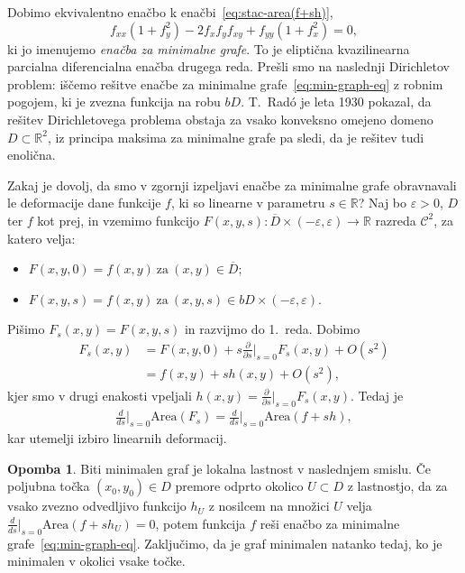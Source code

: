 \documentclass[12pt,a4paper,twoside]{article}
\theoremstyle{definition} %
\newtheorem{opomba}[definicija]{Opomba}
\theoremstyle{plain} %
\numberwithin{equation}{section}  %
\newcommand{\R}{\mathbb R}
\begin{document}
Dobimo ekvivalentno enačbo k enačbi~\eqref{eq:stac-area(f+sh)},
\begin{equation} \label{eq:min-graph-eq}
f_{xx}(1+f_{y}^2) - 2f_{x}f_{y}f_{xy} + f_{yy}(1+f_{x}^2) = 0,
\end{equation}
ki jo imenujemo \emph{enačba za minimalne grafe}.
To je eliptična kvazilinearna parcialna diferencialna enačba drugega reda. \newline
Prešli smo na naslednji Dirichletov problem: iščemo rešitve enačbe za minimalne grafe~\eqref{eq:min-graph-eq} z robnim pogojem, ki je zvezna funkcija na robu $bD$.
T.~Rad\'o je leta 1930 pokazal, da rešitev Dirichletovega problema obstaja za vsako konveksno omejeno domeno $D \subset \R^2$, iz principa maksima za minimalne grafe pa sledi, da je rešitev tudi enolična.

Zakaj je dovolj, da smo v zgornji izpeljavi enačbe za minimalne grafe obravnavali le deformacije dane funkcije $f$, ki so linearne v parametru $s \in \R$? \newline
Naj bo $\varepsilon > 0$, $D$ ter $f$ kot prej, in vzemimo funkcijo $F(x,y,s) \colon \overline{D} \times (-\varepsilon, \varepsilon) \to \R$ razreda $\mathcal{C}^2$, za katero velja:
\begin{itemize}
\item $ F(x,y,0) = f(x,y) \ \text{za} \ (x,y) \in \overline{D}$;
\item $ F(x,y,s) = f(x,y) \ \text{za} \ (x,y,s) \in bD \times (-\varepsilon, \varepsilon)$.
\end{itemize}
Pišimo $F_{s}(x,y) = F(x,y,s)$ in razvijmo do 1.~reda. Dobimo
\begin{align*}
F_{s}(x,y) &= F(x,y,0) + s \frac{\partial}{\partial s} \Big|_{s=0}F_{s}(x,y) + O(s^2) \\
	&= f(x,y) + s h(x,y) + O(s^2),
\end{align*}
kjer smo v drugi enakosti vpeljali $h(x,y)= \frac{\partial}{\partial s} \big|_{s=0}F_{s}(x,y)$. Tedaj je
\begin{gather*}
\frac{d}{ds} \Big|_{s=0} \text{Area}(F_{s}) = \frac{d}{ds} \Big|_{s=0} \text{Area}(f+sh),
\end{gather*}
kar utemelji izbiro linearnih deformacij.

\begin{opomba}
Biti minimalen graf je lokalna lastnost v naslednjem smislu.
Če poljubna točka $(x_0,y_0) \in D$ premore odprto okolico $U \subset D$ z lastnostjo, da za vsako zvezno odvedljivo funkcijo $h_{U}$ z nosilcem na množici $U$  velja $\frac{d}{ds} \big|_{s=0} \text{Area}(f+sh_{U}) = 0$, potem funkcija $f$ reši enačbo za minimalne grafe~\eqref{eq:min-graph-eq}.
Zaključimo, da je graf minimalen natanko tedaj, ko je minimalen v okolici vsake točke.
\end{opomba}
\end{document}
